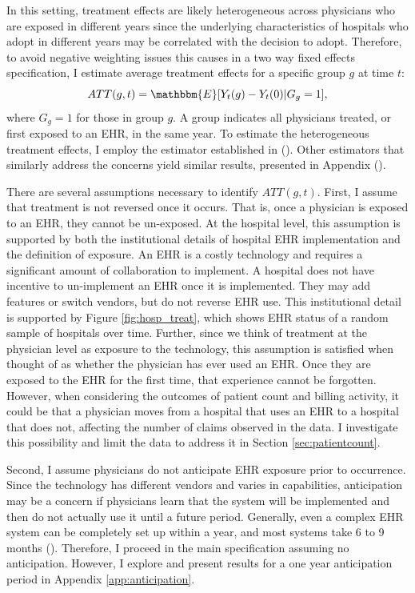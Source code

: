 \documentclass[11pt]{article}
\begin{document}
In this setting, treatment effects are likely heterogeneous across physicians who are exposed in different years since the underlying characteristics of hospitals who adopt in different years may be correlated with the decision to adopt. Therefore, to avoid negative weighting issues this causes in a two way fixed effects specification, I estimate average treatment effects for a specific group $g$ at time $t$: 
$$ATT(g,t)=\mathbbm{E}[Y_t(g)-Y_t(0)|G_g=1],$$
where $G_g=1$ for those in group $g$. A group indicates all physicians treated, or first exposed to an EHR, in the same year. To estimate the heterogeneous treatment effects, I employ the estimator established in \citeauthor{callaway2021difference} (\citeyear{callaway2021difference}). Other estimators that similarly address the concerns yield similar results, presented in Appendix ().

There are several assumptions necessary to identify $ATT(g,t)$. First, I assume that treatment is not reversed once it occurs. That is, once a physician is exposed to an EHR, they cannot be un-exposed. At the hospital level, this assumption is supported by both the institutional details of hospital EHR implementation and the definition of exposure. An EHR is a costly technology and requires a significant amount of collaboration to implement. A hospital does not have incentive to un-implement an EHR once it is implemented. They may add features or switch vendors, but do not reverse EHR use. This institutional detail is supported by Figure \ref{fig:hosp_treat}, which shows EHR status of a random sample of hospitals over time. Further, since we think of treatment at the physician level as exposure to the technology, this assumption is satisfied when thought of as whether the physician has ever used an EHR. Once they are exposed to the EHR for the first time, that experience cannot be forgotten. However, when considering the outcomes of patient count and billing activity, it could be that a physician moves from a hospital that uses an EHR to a hospital that does not, affecting the number of claims observed in the data. I investigate this possibility and limit the data to address it in Section \ref{sec:patientcount}. 

Second, I assume physicians do not anticipate EHR exposure prior to occurrence. Since the technology has different vendors and varies in capabilities, anticipation may be a concern if physicians learn that the system will be implemented and then do not actually use it until a future period. Generally, even a complex EHR system can be completely set up within a year, and most systems take 6 to 9 months (\cite{uzialko_2021}). Therefore, I proceed in the main specification assuming no anticipation. However, I explore and present results for a one year anticipation period in Appendix \ref{app:anticipation}. 
\end{document}
